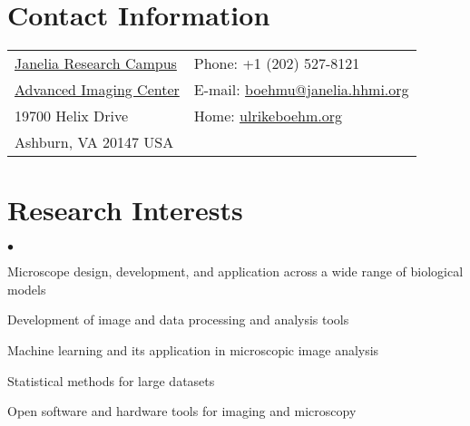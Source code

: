 \documentclass[margin,line]{res}
\newenvironment{list2}{
  \begin{list}{$\bullet$}{%
      \setlength{\itemsep}{0in}
      \setlength{\parsep}{0in} \setlength{\parskip}{0in}
      \setlength{\topsep}{0in} \setlength{\partopsep}{0in} 
      \setlength{\leftmargin}{0.2in}}}{\end{list}}
\begin{document}


\begin{resume}


\section{\sc Contact Information}
\vspace{.05in}
\begin{tabular}{@{}p{3.5in}p{4in}}
 \href{https://www.janelia.org/}{Janelia Research Campus}     & {Phone:} +1 (202) 527-8121 \\            
 \href{https://www.aicjanelia.org/}{Advanced Imaging Center}   & { E-mail:}   \href{mailto:boehmu@janelia.hhmi.org}{boehmu@janelia.hhmi.org}  \\         
19700 Helix Drive & { Home:}  \href{http://ulrikeboehm.org/}{ulrikeboehm.org}\\       
Ashburn, VA  20147 USA  &  \\     
\end{tabular}


\section{\sc Research Interests}
\begin{list2}
\item Microscope design, development, and application across a wide range of biological models 
\item Development of image and data processing and analysis tools
\item Machine learning and its application in microscopic image analysis
\item Statistical methods for large datasets
\item Open software and hardware tools for imaging and microscopy
\end{list2}



\end{resume}
\end{document}

